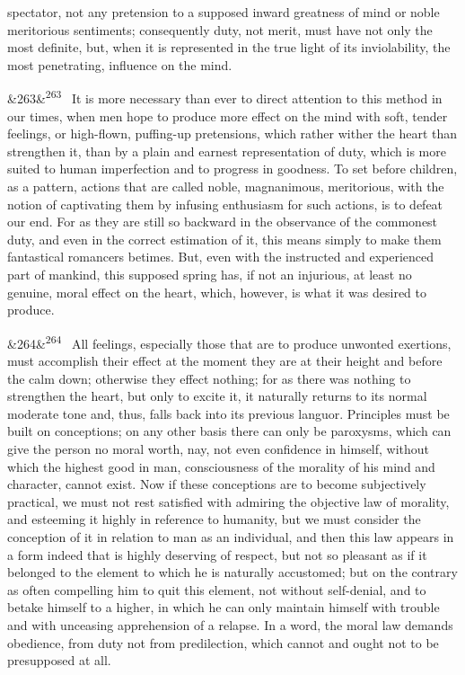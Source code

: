 \documentclass[12pt]{article}
\newcommand{\para}[1][]{\par\noindent\ifx&#1&\else\textsuperscript{\footnotesize #1}~\fi}
\begin{document}
spectator, not any pretension to a supposed inward greatness of mind or noble meritorious sentiments; consequently duty, not merit, must have not only the most definite, but, when it is represented in the true light of its inviolability, the most penetrating, influence on the mind.

\para[263] It is more necessary than ever to direct attention to this method in our times, when men hope to produce more effect on the mind with soft, tender feelings, or high-flown, puffing-up pretensions, which rather wither the heart than strengthen it, than by a plain and earnest representation of duty, which is more suited to human imperfection and to progress in goodness. To set before children, as a pattern, actions that are called noble, magnanimous, meritorious, with the notion of captivating them by infusing enthusiasm for such actions, is to defeat our end. For as they are still so backward in the observance of the commonest duty, and even in the correct estimation of it, this means simply to make them fantastical romancers betimes. But, even with the instructed and experienced part of mankind, this supposed spring has, if not an injurious, at least no genuine, moral effect on the heart, which, however, is what it was desired to produce.

\para[264] All feelings, especially those that are to produce unwonted exertions, must accomplish their effect at the moment they are at their height and before the calm down; otherwise they effect nothing; for as there was nothing to strengthen the heart, but only to excite it, it naturally returns to its normal moderate tone and, thus, falls back into its previous languor. Principles must be built on conceptions; on any other basis there can only be paroxysms, which can give the person no moral worth, nay, not even confidence in himself, without which the highest good in man, consciousness of the morality of his mind and character, cannot exist. Now if these conceptions are to become subjectively practical, we must not rest satisfied with admiring the objective law of morality, and esteeming it highly in reference to humanity, but we must consider the conception of it in relation to man as an individual, and then this law appears in a form indeed that is highly deserving of respect, but not so pleasant as if it belonged to the element to which he is naturally accustomed; but on the contrary as often compelling him to quit this element, not without self-denial, and to betake himself to a higher, in which he can only maintain himself with trouble and with unceasing apprehension of a relapse. In a word, the moral law demands obedience, from duty not from predilection, which cannot and ought not to be presupposed at all.
\end{document}
